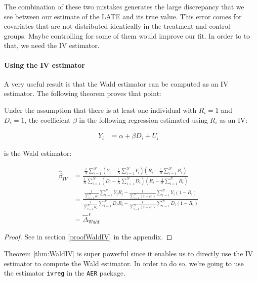 \documentclass[]{book}
\let\oldparagraph\paragraph
\renewcommand{\paragraph}[1]{\oldparagraph{#1}\mbox{}}
\theoremstyle{definition}
\theoremstyle{definition}
\theoremstyle{definition}
\theoremstyle{remark}
\let\BeginKnitrBlock\begin \let\EndKnitrBlock\end
\begin{document}
The combination of these two mistakes generates the large discrepancy that we see between our estimate of the LATE and its true value.
This error comes for covariates that are not distributed identically in the treatment and control groups.
Maybe controlling for some of them would improve our fit.
In order to to that, we need the IV estimator.

\hypertarget{using-the-iv-estimator}{%
\paragraph{Using the IV estimator}\label{using-the-iv-estimator}}

A very useful result is that the Wald estimator can be computed as an IV estimator.
The following theorem proves that point:

\BeginKnitrBlock{theorem}[Wald is IV]
\protect\hypertarget{thm:WaldIV}{}{\label{thm:WaldIV} \iffalse (Wald is IV) \fi{} }Under the assumption that there is at least one individual with \(R_i=1\) and \(D_i=1\), the coefficient \(\beta\) in the following regression estimated using \(R_i\) as an IV:

\begin{align*}
        Y_i &  = \alpha + \beta D_i + U_i
    \end{align*}

is the Wald estimator:

\begin{align*}
\hat{\beta}_{IV} & = \frac{\frac{1}{N}\sum_{i=1}^N\left(Y_i-\frac{1}{N}\sum_{i=1}^NY_i\right)\left(R_i-\frac{1}{N}\sum_{i=1}^NR_i\right)}{\frac{1}{N}\sum_{i=1}^N\left(D_i-\frac{1}{N}\sum_{i=1}^ND_i\right)\left(R_i-\frac{1}{N}\sum_{i=1}^NR_i\right)} \\
                                & = \frac{\frac{1}{\sum_{i=1}^N R_i}\sum_{i=1}^N Y_iR_i-\frac{1}{\sum_{i=1}^N (1-R_i)}\sum_{i=1}^N Y_i(1-R_i)}{\frac{1}{\sum_{i=1}^N R_i}\sum_{i=1}^N D_iR_i-\frac{1}{\sum_{i=1}^N (1-R_i)}\sum_{i=1}^N D_i(1-R_i)}\\
                  & = \hat{\Delta}^Y_{Wald} 
\end{align*}
\EndKnitrBlock{theorem}

\BeginKnitrBlock{proof}
\iffalse{} {Proof. } \fi{}See in section \ref{proofWaldIV} in the appendix.
\EndKnitrBlock{proof}

Theorem \ref{thm:WaldIV} is super powerful since it enables us to directly use the IV estimator to compute the Wald estimator.
In order to do so, we're going to use the estimator \texttt{ivreg} in the \texttt{AER} package.
\end{document}
